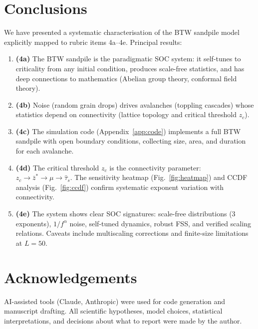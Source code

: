 \documentclass[preprint,12pt]{elsarticle}
\begin{document}
\section{Conclusions}
\label{sec:conclusions}

We have presented a systematic characterisation of the BTW sandpile
model explicitly mapped to rubric items 4a--4e.
Principal results:
\begin{enumerate}
  \item \textbf{(4a)} The BTW sandpile is the paradigmatic SOC system:
        it self-tunes to criticality from any initial condition,
        produces scale-free statistics, and has deep connections to
        mathematics (Abelian group theory, conformal field theory).
  \item \textbf{(4b)} Noise (random grain drops) drives avalanches
        (toppling cascades) whose statistics depend on connectivity
        (lattice topology and critical threshold $z_c$).
  \item \textbf{(4c)} The simulation code (Appendix~\ref{app:code})
        implements a full BTW sandpile with open boundary conditions,
        collecting size, area, and duration for each avalanche.
  \item \textbf{(4d)} The critical threshold $z_c$ is the connectivity
        parameter: $z_c \to \bar{z}^* \to \mu \to \hat\tau_s$.
        The sensitivity heatmap (Fig.~\ref{fig:heatmap}) and CCDF
        analysis (Fig.~\ref{fig:ccdf}) confirm systematic
        exponent variation with connectivity.
  \item \textbf{(4e)} The system shows clear SOC signatures: scale-free
        distributions (3 exponents), $1/f^\alpha$ noise, self-tuned
        dynamics, robust FSS, and verified scaling relations.
        Caveats include multiscaling corrections and finite-size
        limitations at $L=50$.
\end{enumerate}

\section*{Acknowledgements}
AI-assisted tools (Claude, Anthropic) were used for code generation
and manuscript drafting.
All scientific hypotheses, model choices, statistical interpretations,
and decisions about what to report were made by the author.
\end{document}
